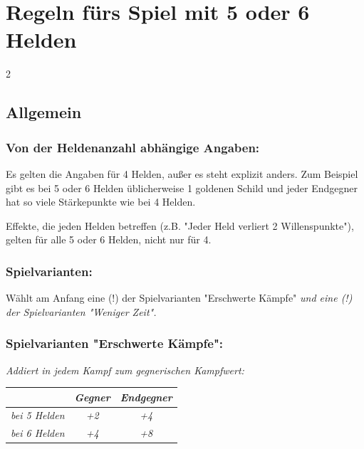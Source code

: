 \documentclass[10pt, a4paper, oneside]{book}
\newcommand{\fan}[1]{\textit{#1}}
\begin{document}
\chapter{Regeln fürs Spiel mit 5 oder 6 Helden}
\label{5 oder 6 Helden}


\begin{multicols*}{2}\raggedcolumns


\begin{nobgcolor}

\section{Allgemein}



\subsection{Von der Heldenanzahl abhängige Angaben:}

Es gelten die Angaben für 4 Helden, außer es steht explizit anders. 
Zum Beispiel gibt es bei 5 oder 6 Helden üblicherweise 1 goldenen Schild und jeder Endgegner hat so viele Stärkepunkte wie bei 4 Helden.
\supercite{NH:Begleitheft,DH:Begleitheft,MH:Begleitheft,BiBo:Bonus-Heft}

Effekte, die jeden Helden betreffen (z.B. "Jeder Held verliert 2 Willenspunkte"), gelten für alle 5 oder 6 Helden, nicht nur für 4.




\subsection{Spielvarianten:}

Wählt am Anfang eine (!) der Spielvarianten "Erschwerte Kämpfe"\supercite{AG:Begleitheft,DZ:Begleitheft} \fan{und eine (!) der Spielvarianten "Weniger Zeit".}



\subsection{Spielvarianten "Erschwerte Kämpfe":}

\bullet{} \fan{Addiert in jedem Kampf zum gegnerischen Kampfwert:}

\begin{tabular}{|c|c|c|}
    \hline
    & \fan{Gegner}
    & \fan{Endgegner}
    \\
    \hline
    \fan{bei 5 Helden}
    & \fan{+2}
    & \fan{+4}
    \\
    \hline
    \fan{bei 6 Helden}
    & \fan{+4}
    & \fan{+8}
    \\
    \hline
\end{tabular}



\end{nobgcolor}
\end{multicols*}
\end{document}
